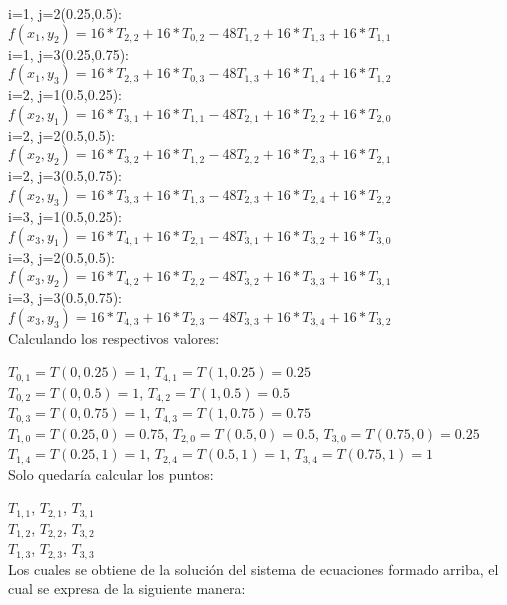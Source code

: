 i=1, j=2(0.25,0.5):\\
$f(x_1,y_2) = 16*T_{2,2} + 16*T_{0,2} - 48 T_{1,2} + 16*T_{1,3} + 16*T_{1,1}$\\

i=1, j=3(0.25,0.75):\\
$f(x_1,y_3) = 16*T_{2,3} + 16*T_{0,3} - 48 T_{1,3} + 16*T_{1,4} + 16*T_{1,2}$\\

i=2, j=1(0.5,0.25):\\
$f(x_2,y_1) = 16*T_{3,1} + 16*T_{1,1} - 48 T_{2,1} + 16*T_{2,2} + 16*T_{2,0}$\\

i=2, j=2(0.5,0.5):\\
$f(x_2,y_2) = 16*T_{3,2} + 16*T_{1,2} - 48 T_{2,2} + 16*T_{2,3} + 16*T_{2,1}$\\

i=2, j=3(0.5,0.75):\\
$f(x_2,y_3) = 16*T_{3,3} + 16*T_{1,3} - 48 T_{2,3} + 16*T_{2,4} + 16*T_{2,2}$\\

i=3, j=1(0.5,0.25):\\
$f(x_3,y_1) = 16*T_{4,1} + 16*T_{2,1} - 48 T_{3,1} + 16*T_{3,2} + 16*T_{3,0}$\\

i=3, j=2(0.5,0.5):\\
$f(x_3,y_2) = 16*T_{4,2} + 16*T_{2,2} - 48 T_{3,2} + 16*T_{3,3} + 16*T_{3,1}$\\

i=3, j=3(0.5,0.75):\\
$f(x_3,y_3) = 16*T_{4,3} + 16*T_{2,3} - 48 T_{3,3} + 16*T_{3,4} + 16*T_{3,2}$\\

Calculando los respectivos valores:

$T_{0,1} = T(0, 0.25) = 1 $, $T_{4,1} = T(1,0.25) = 0.25$\\
$T_{0,2} = T(0, 0.5) = 1$, $T_{4,2} = T(1,0.5) = 0.5 $\\
$T_{0,3} = T(0, 0.75) = 1$, $T_{4,3} = T(1,0.75) = 0.75 $\\
$T_{1,0} = T(0.25, 0) = 0.75$, $T_{2,0} = T(0.5, 0) = 0.5$, $T_{3,0} = T(0.75, 0) = 0.25$\\
$T_{1,4} = T(0.25, 1) = 1$, $T_{2,4} = T(0.5,1) = 1$, $T_{3,4} = T(0.75,1) = 1$\\
Solo quedaría calcular los puntos:

$T_{1,1} $, $T_{2,1} $, $T_{3,1} $\\
$T_{1,2}$, $T_{2,2} $, $T_{3,2} $\\
$T_{1,3} $, $T_{2,3} $, $T_{3,3} $\\
Los cuales se obtiene de la solución del sistema de ecuaciones formado arriba, el cual se expresa de la siguiente manera:

